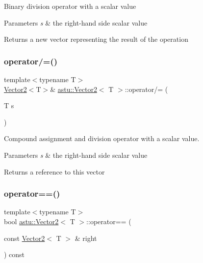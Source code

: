 Binary division operator with a scalar value


\begin{DoxyParams}{Parameters}
{\em s} & the right-\/hand side scalar value \\
\hline
\end{DoxyParams}
\begin{DoxyReturn}{Returns}
a new vector representing the result of the operation 
\end{DoxyReturn}
\mbox{\label{classastu_1_1Vector2_a9f9362218a0d011032324cbc7a9a85a1}} 
\subsubsection{\texorpdfstring{operator/=()}{operator/=()}}
{\footnotesize\ttfamily template$<$typename T$>$ \\
\hyperlink{classastu_1_1Vector2}{Vector2}$<$T$>$\& \hyperlink{classastu_1_1Vector2}{astu\+::\+Vector2}$<$ T $>$\+::operator/= (\begin{DoxyParamCaption}\item[{T}]{s }\end{DoxyParamCaption})\hspace{0.3cm}{\ttfamily [inline]}}

Compound assignment and division operator with a scalar value.


\begin{DoxyParams}{Parameters}
{\em s} & the right-\/hand side scalar value \\
\hline
\end{DoxyParams}
\begin{DoxyReturn}{Returns}
a reference to this vector 
\end{DoxyReturn}
\mbox{\label{classastu_1_1Vector2_ada7f1d693330e7671cb1f951d8011c08}} 
\subsubsection{\texorpdfstring{operator==()}{operator==()}}
{\footnotesize\ttfamily template$<$typename T$>$ \\
bool \hyperlink{classastu_1_1Vector2}{astu\+::\+Vector2}$<$ T $>$\+::operator== (\begin{DoxyParamCaption}\item[{const \hyperlink{classastu_1_1Vector2}{Vector2}$<$ T $>$ \&}]{right }\end{DoxyParamCaption}) const\hspace{0.3cm}{\ttfamily [inline]}}

